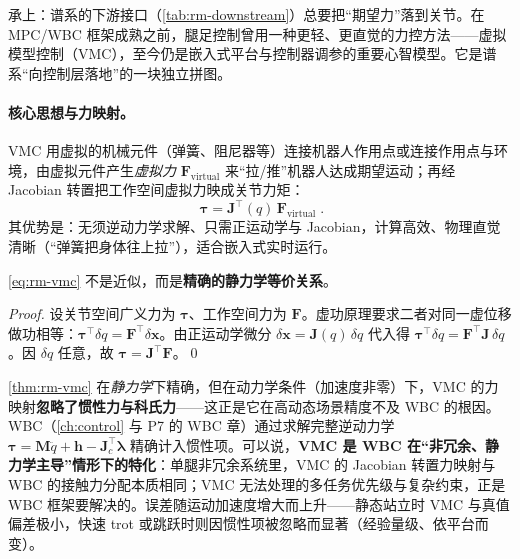 承上：谱系的下游接口（\cref{tab:rm-downstream}）总要把“期望力”落到关节。在 MPC/WBC 框架成熟之前，腿足控制曾用一种更轻、更直觉的力控方法——虚拟模型控制（VMC），至今仍是嵌入式平台与控制器调参的重要心智模型。它是谱系“向控制层落地”的一块独立拼图。

\paragraph{核心思想与力映射。}
VMC 用虚拟的机械元件（弹簧、阻尼器等）连接机器人作用点或连接作用点与环境，由虚拟元件产生\emph{虚拟力} $\mathbf{F}_{\mathrm{virtual}}$ 来“拉/推”机器人达成期望运动；再经 Jacobian 转置把工作空间虚拟力映成关节力矩：
\begin{equation}
  \boxed{\;\boldsymbol{\tau}=\mathbf{J}^\top(q)\,\mathbf{F}_{\mathrm{virtual}}\;}.
  \label{eq:rm-vmc}
\end{equation}
其优势是：无须逆动力学求解、只需正运动学与 Jacobian，计算高效、物理直觉清晰（“弹簧把身体往上拉”），适合嵌入式实时运行。

\begin{theorem}
\label{thm:rm-vmc}
\cref{eq:rm-vmc} 不是近似，而是\textbf{精确的静力学等价关系}。
\end{theorem}
\begin{proof}
设关节空间广义力为 $\boldsymbol{\tau}$、工作空间力为 $\mathbf{F}$。虚功原理要求二者对同一虚位移做功相等：$\boldsymbol{\tau}^\top\delta q=\mathbf{F}^\top\delta\mathbf{x}$。由正运动学微分 $\delta\mathbf{x}=\mathbf{J}(q)\,\delta q$ 代入得 $\boldsymbol{\tau}^\top\delta q=\mathbf{F}^\top\mathbf{J}\,\delta q$。因 $\delta q$ 任意，故 $\boldsymbol{\tau}=\mathbf{J}^\top\mathbf{F}$。\qed
\end{proof}

\begin{insight}
\cref{thm:rm-vmc} 在\emph{静力学}下精确，但在动力学条件（加速度非零）下，VMC 的力映射\textbf{忽略了惯性力与科氏力}——这正是它在高动态场景精度不及 WBC 的根因。WBC（\cref{ch:control} 与 P7 的 WBC 章）通过求解完整逆动力学 $\boldsymbol{\tau}=\mathbf{M}\ddot{q}+\mathbf{h}-\mathbf{J}_c^\top\boldsymbol{\lambda}$ 精确计入惯性项。可以说，\textbf{VMC 是 WBC 在“非冗余、静力学主导”情形下的特化}：单腿非冗余系统里，VMC 的 Jacobian 转置力映射与 WBC 的接触力分配本质相同；VMC 无法处理的多任务优先级与复杂约束，正是 WBC 框架要解决的。误差随运动加速度增大而上升——静态站立时 VMC 与真值偏差极小，快速 trot 或跳跃时则因惯性项被忽略而显著（经验量级、依平台而变）。
\end{insight}

